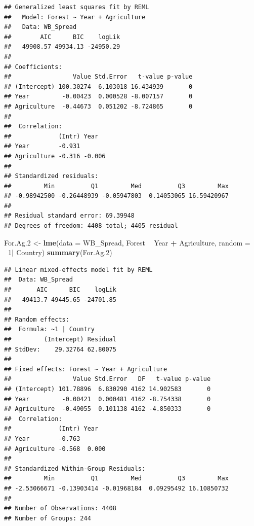 \documentclass[12pt,]{article}
\newenvironment{Shaded}{\begin{snugshade}}{\end{snugshade}}
\newcommand{\KeywordTok}[1]{\textcolor[rgb]{0.13,0.29,0.53}{\textbf{#1}}}
\newcommand{\DataTypeTok}[1]{\textcolor[rgb]{0.13,0.29,0.53}{#1}}
\newcommand{\DecValTok}[1]{\textcolor[rgb]{0.00,0.00,0.81}{#1}}
\newcommand{\StringTok}[1]{\textcolor[rgb]{0.31,0.60,0.02}{#1}}
\newcommand{\OperatorTok}[1]{\textcolor[rgb]{0.81,0.36,0.00}{\textbf{#1}}}
\newcommand{\NormalTok}[1]{#1}
\begin{document}
\begin{verbatim}
## Generalized least squares fit by REML
##   Model: Forest ~ Year + Agriculture 
##   Data: WB_Spread 
##        AIC      BIC    logLik
##   49908.57 49934.13 -24950.29
## 
## Coefficients:
##                 Value Std.Error   t-value p-value
## (Intercept) 100.30274  6.103018 16.434939       0
## Year         -0.00423  0.000528 -8.007157       0
## Agriculture  -0.44673  0.051202 -8.724865       0
## 
##  Correlation: 
##             (Intr) Year  
## Year        -0.931       
## Agriculture -0.316 -0.006
## 
## Standardized residuals:
##         Min          Q1         Med          Q3         Max 
## -0.98942500 -0.26448939 -0.05947803  0.14053065 16.59420967 
## 
## Residual standard error: 69.39948 
## Degrees of freedom: 4408 total; 4405 residual
\end{verbatim}

\begin{Shaded}
\begin{Highlighting}[]
\NormalTok{For.Ag.}\DecValTok{2}\NormalTok{ <-}\StringTok{  }\KeywordTok{lme}\NormalTok{(}\DataTypeTok{data =}\NormalTok{ WB_Spread,}
\NormalTok{              Forest }\OperatorTok{~}\StringTok{ }\NormalTok{Year }\OperatorTok{+}\StringTok{ }\NormalTok{Agriculture,}
              \DataTypeTok{random =} \OperatorTok{~}\DecValTok{1}\OperatorTok{|}\StringTok{ }\NormalTok{Country)}
\KeywordTok{summary}\NormalTok{(For.Ag.}\DecValTok{2}\NormalTok{)}
\end{Highlighting}
\end{Shaded}

\begin{verbatim}
## Linear mixed-effects model fit by REML
##  Data: WB_Spread 
##       AIC      BIC    logLik
##   49413.7 49445.65 -24701.85
## 
## Random effects:
##  Formula: ~1 | Country
##         (Intercept) Residual
## StdDev:    29.32764 62.80075
## 
## Fixed effects: Forest ~ Year + Agriculture 
##                 Value Std.Error   DF   t-value p-value
## (Intercept) 101.78896  6.830290 4162 14.902583       0
## Year         -0.00421  0.000481 4162 -8.754338       0
## Agriculture  -0.49055  0.101138 4162 -4.850333       0
##  Correlation: 
##             (Intr) Year  
## Year        -0.763       
## Agriculture -0.568  0.000
## 
## Standardized Within-Group Residuals:
##         Min          Q1         Med          Q3         Max 
## -2.53066671 -0.13903414 -0.01968184  0.09295492 16.10850732 
## 
## Number of Observations: 4408
## Number of Groups: 244
\end{verbatim}
\end{document}
